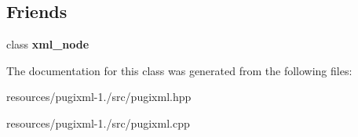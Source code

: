 \subsection*{Friends}
\begin{DoxyCompactItemize}
\item 
\hypertarget{classpugi_1_1xml__text_a156d917a92815c7b593bd5ef19f6d5fb}{class {\bfseries xml\+\_\+node}}\label{classpugi_1_1xml__text_a156d917a92815c7b593bd5ef19f6d5fb}

\end{DoxyCompactItemize}


The documentation for this class was generated from the following files\+:\begin{DoxyCompactItemize}
\item 
resources/pugixml-\/1./src/pugixml.\+hpp\item 
resources/pugixml-\/1./src/pugixml.\+cpp\end{DoxyCompactItemize}
